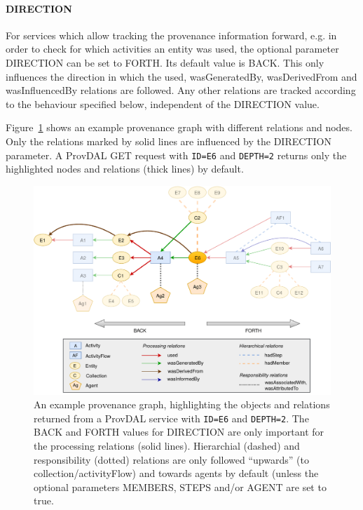 
\paragraph{DIRECTION}
For services which allow tracking the provenance information forward, e.g. in order to check for which activities an entity was used, the optional parameter DIRECTION can be set to FORTH. Its default value is BACK. This only influences the direction in which the used, wasGeneratedBy, wasDerivedFrom and wasInfluencedBy relations are followed. Any other relations are tracked according to the behaviour specified below, independent of the DIRECTION value.


Figure~\ref{fig:provenance-graph-example} shows an example provenance graph with different relations and nodes. Only the relations marked by solid lines are influenced by the DIRECTION parameter. A ProvDAL GET request with \texttt{ID=E6} and \texttt{DEPTH=2} returns only the highlighted nodes and relations (thick lines) by default.

\begin{figure}[h]
\centering
\includegraphics[width=1.0\textwidth]{provenance-graph-example-depth2.pdf}
\caption[Example provenance graph for ProvDAL]{An example provenance graph, highlighting the objects and relations returned from a ProvDAL service with \texttt{ID=E6} and \texttt{DEPTH=2}. The BACK and FORTH values for DIRECTION are only important for the processing relations (solid lines). Hierarchial (dashed) and responsibility (dotted) relations are only followed ``upwards'' (to collection/activityFlow) and towards agents by default (unless the optional parameters MEMBERS, STEPS and/or AGENT are set to true.}
\label{fig:provenance-graph-example}
\end{figure}




